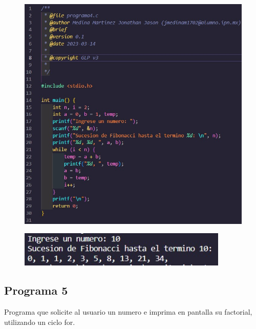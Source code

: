 \documentclass{article}
\begin{document}
\begin{figure}[H]
    \centering
    \includegraphics[width = 15cm]{img4a.jpg}
\end{figure}
\begin{figure}[H]
    \centering
    \includegraphics[width = 10cm]{img4b.jpg}
\end{figure}
\newpage
\subsection{Programa 5}

Programa que solicite al usuario un numero e imprima en pantalla su factorial, utilizando un ciclo for.
\end{document}
